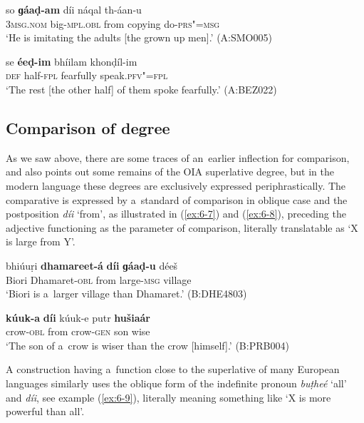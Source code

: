 \begin{exe}
\ex
\label{ex:6-5}
\gll so \textbf{ɡáaḍ-am} díi náqal th-áan-u \\
\textsc{3msg.nom} big-\textsc{mpl.obl} from copying do-\textsc{prs"=msg} \\
\glt `He is imitating the adults [the grown up men].' (A:SMO005)

\ex
\label{ex:6-6}
\gll se \textbf{éeḍ-im} bhíilam khonḍíl-im \\
\textsc{def} half-\textsc{fpl} fearfully speak.\textsc{pfv"=fpl} \\
\glt `The rest [the other half] of them spoke fearfully.' (A:BEZ022)
\end{exe}

\subsection{Comparison of degree}
\label{subsec:6-3-3}

As we saw above, there are some traces of an~earlier inflection for comparison, and \citet[17]{morgenstierne1941} also points out some remains of the OIA superlative degree, but in the modern language these degrees are exclusively expressed periphrastically. The comparative is expressed by a~standard of comparison in oblique case and the postposition \textit{díi} `from', as illustrated in (\ref{ex:6-7}) and (\ref{ex:6-8}), preceding the adjective functioning as the parameter of comparison, literally translatable as `X is large from Y'. 

\begin{exe}
\ex
\label{ex:6-7}
\gll bhiúuṛi \textbf{dhamareet-á} \textbf{díi} \textbf{ɡáaḍ-u} déeš \\
Biori Dhamaret-\textsc{obl} from large-\textsc{msg} village \\
\glt `Biori is a~larger village than Dhamaret.' (B:DHE4803)

\ex
\label{ex:6-8}
\gll \textbf{kúuk-a} \textbf{díi} kúuk-e putr \textbf{hušiaár} \\
crow-\textsc{obl} from crow-\textsc{gen} son wise  \\
\glt `The son of a~crow is wiser than the crow [himself].' (B:PRB004)
\end{exe}

A construction having a~function close to the superlative of many European languages similarly uses the oblique form of the indefinite pronoun \textit{buṭheé} `all' and \textit{díi}, see example (\ref{ex:6-9}), literally meaning something like `X is more powerful than all'.

